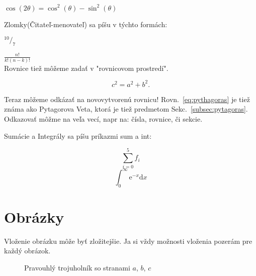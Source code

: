 \documentclass[12pt]{article}
\begin{document}
$\cos(2\theta) = \cos^{2}(\theta) - \sin^{2}(\theta)$

Zlomky(Čitateľ-menovateľ) sa píšu v týchto formách:

$^{10}/_{7}$ 

$\frac{n!}{k!(n - k)!}$ \\

Rovnice tiež môžeme zadať v "rovnicovom prostredí". 

\begin{equation} %
    c^2 = a^2 + b^2.
    \label{eq:pythagoras} %
\end{equation} %

Teraz môžeme odkázať na novovytvorenú rovnicu! 
Rovn.~\ref{eq:pythagoras} je tiež známa ako Pytagorova Veta, ktorá je tiež predmetom Sekc.~\ref{subsec:pytagoras}. Odkazovať môžme na veľa vecí, napr na: čísla, rovnice, či sekcie.

Sumácie a Integrály sa píšu príkazmi sum a int:

\begin{equation} 
  \sum_{i=0}^{5} f_{i}
\end{equation} 
\begin{equation} 
  \int_{0}^{\infty} \mathrm{e}^{-x} \mathrm{d}x
\end{equation} 

\section{Obrázky}

Vloženie obrázku môže byť zložitejšie. Ja si vždy možnosti vloženia pozerám pre každý obrázok.
\renewcommand\figurename{Obrázok}
\begin{figure}[H] %
    \centering %
    \caption{Pravouhlý trojuholník so stranami $a$, $b$, $c$}
    \label{fig:right-triangle}
\end{figure}
\renewcommand\tablename{Tabuľka}
\end{document}
